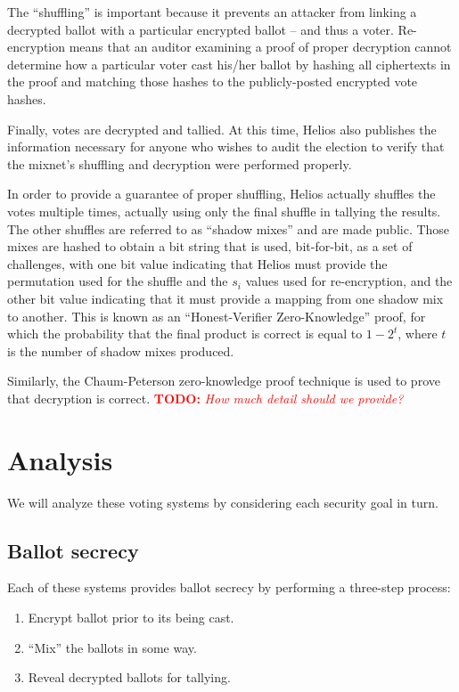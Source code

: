 \documentclass[10pt]{article}
\newcommand{\todo}[1]{\textcolor{red}{\textbf{TODO:} \emph{#1}}}
\begin{document}
\begin{multicols}{2}
The ``shuffling'' is important because it prevents an attacker from linking a decrypted ballot with
a particular encrypted ballot -- and thus a voter. Re-encryption means that an auditor examining a
proof of proper decryption cannot determine how a particular voter cast his/her ballot by hashing
all ciphertexts in the proof and matching those hashes to the publicly-posted encrypted vote hashes.

Finally, votes are decrypted and tallied. At this time, Helios also publishes the information
necessary for anyone who wishes to audit the election to verify that the mixnet's shuffling and
decryption were performed properly.

In order to provide a guarantee of proper shuffling, Helios actually shuffles the votes multiple
times, actually using only the final shuffle in tallying the results. The other shuffles are
referred to as ``shadow mixes'' and are made public. Those mixes are hashed to obtain a bit string
that is used, bit-for-bit, as a set of challenges, with one bit value indicating that Helios must
provide the permutation used for the shuffle and the $s_{i}$ values used for re-encryption, and the
other bit value indicating that it must provide a mapping from one shadow mix to another. This is
known as an ``Honest-Verifier Zero-Knowledge'' proof, for which the probability that the final
product is correct is equal to $1 - 2^{t}$, where $t$ is the number of shadow mixes produced.

Similarly, the Chaum-Peterson zero-knowledge proof technique is used to prove that decryption is
correct. \todo{How much detail should we provide?}

\section{Analysis}

We will analyze these voting systems by considering each security goal in turn.

\subsection{Ballot secrecy}

Each of these systems provides ballot secrecy by performing a three-step process:
\begin{enumerate}
	\item
		Encrypt ballot prior to its being cast.
	\item
		``Mix'' the ballots in some way.
	\item
		Reveal decrypted ballots for tallying.
\end{enumerate}


\end{multicols}
\end{document}
